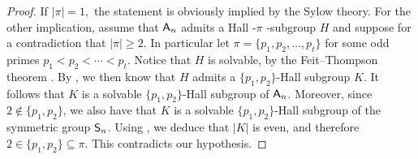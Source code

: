 \documentclass[12pt]{amsart}
\theoremstyle{definition}
\numberwithin{equation}{section}
\newcommand{\Al}{\textup{\textsf{A}}}
\newcommand{\Sy}{\textup{\textsf{S}}}
\begin{document}
\begin{proof}
If $|\pi|=1,$ the statement is obviously implied by the Sylow theory.
For the other %
implication, assume that $\Al_n$ admits %
a Hall
-$\pi$%
-subgroup $H$ and suppose for a contradiction that $|\pi|\geq
2$. %
In particular let %
$\pi=\{p_1,p_2,\ldots, p_t\}$ for some odd
primes $p_1<p_2<\cdots<p_t$. %
Notice that $H$ is solvable, by the Feit--Thompson theorem
\cite{Thompson63}. By \cite{Hall1}, we then know that $H$ admits a
$\{p_1,p_2\}$-Hall subgroup $K$. It follows that $K$ %
is a solvable
$\{p_1,p_2\}$-Hall subgroup of $\Al_n$. Moreover, %
since $2\notin
\{p_1,p_2\}$, we %
also have that $K$ is a solvable $\{p_1,p_2\}$-Hall
subgroup of the symmetric group $\Sy_n$. Using \cite[Theorem
A4]{Hall2}, we deduce that $|K|$ is even, and therefore $2\in
\{p_1,p_2\}\subseteq \pi$. %
This  contradicts %
our hypothesis.
%
%
\end{proof}
\end{document}
